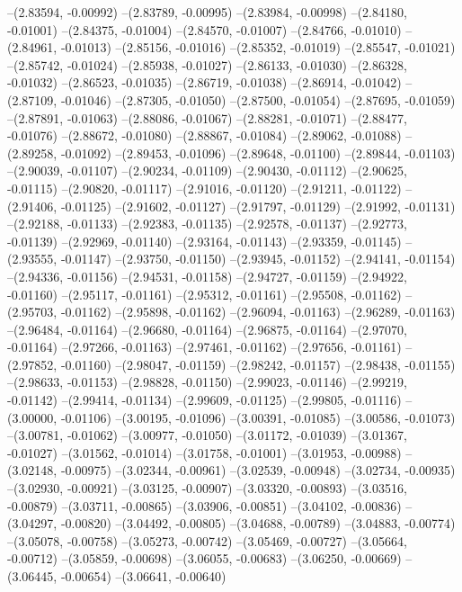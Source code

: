 --(2.83594, -0.00992)
--(2.83789, -0.00995)
--(2.83984, -0.00998)
--(2.84180, -0.01001)
--(2.84375, -0.01004)
--(2.84570, -0.01007)
--(2.84766, -0.01010)
--(2.84961, -0.01013)
--(2.85156, -0.01016)
--(2.85352, -0.01019)
--(2.85547, -0.01021)
--(2.85742, -0.01024)
--(2.85938, -0.01027)
--(2.86133, -0.01030)
--(2.86328, -0.01032)
--(2.86523, -0.01035)
--(2.86719, -0.01038)
--(2.86914, -0.01042)
--(2.87109, -0.01046)
--(2.87305, -0.01050)
--(2.87500, -0.01054)
--(2.87695, -0.01059)
--(2.87891, -0.01063)
--(2.88086, -0.01067)
--(2.88281, -0.01071)
--(2.88477, -0.01076)
--(2.88672, -0.01080)
--(2.88867, -0.01084)
--(2.89062, -0.01088)
--(2.89258, -0.01092)
--(2.89453, -0.01096)
--(2.89648, -0.01100)
--(2.89844, -0.01103)
--(2.90039, -0.01107)
--(2.90234, -0.01109)
--(2.90430, -0.01112)
--(2.90625, -0.01115)
--(2.90820, -0.01117)
--(2.91016, -0.01120)
--(2.91211, -0.01122)
--(2.91406, -0.01125)
--(2.91602, -0.01127)
--(2.91797, -0.01129)
--(2.91992, -0.01131)
--(2.92188, -0.01133)
--(2.92383, -0.01135)
--(2.92578, -0.01137)
--(2.92773, -0.01139)
--(2.92969, -0.01140)
--(2.93164, -0.01143)
--(2.93359, -0.01145)
--(2.93555, -0.01147)
--(2.93750, -0.01150)
--(2.93945, -0.01152)
--(2.94141, -0.01154)
--(2.94336, -0.01156)
--(2.94531, -0.01158)
--(2.94727, -0.01159)
--(2.94922, -0.01160)
--(2.95117, -0.01161)
--(2.95312, -0.01161)
--(2.95508, -0.01162)
--(2.95703, -0.01162)
--(2.95898, -0.01162)
--(2.96094, -0.01163)
--(2.96289, -0.01163)
--(2.96484, -0.01164)
--(2.96680, -0.01164)
--(2.96875, -0.01164)
--(2.97070, -0.01164)
--(2.97266, -0.01163)
--(2.97461, -0.01162)
--(2.97656, -0.01161)
--(2.97852, -0.01160)
--(2.98047, -0.01159)
--(2.98242, -0.01157)
--(2.98438, -0.01155)
--(2.98633, -0.01153)
--(2.98828, -0.01150)
--(2.99023, -0.01146)
--(2.99219, -0.01142)
--(2.99414, -0.01134)
--(2.99609, -0.01125)
--(2.99805, -0.01116)
--(3.00000, -0.01106)
--(3.00195, -0.01096)
--(3.00391, -0.01085)
--(3.00586, -0.01073)
--(3.00781, -0.01062)
--(3.00977, -0.01050)
--(3.01172, -0.01039)
--(3.01367, -0.01027)
--(3.01562, -0.01014)
--(3.01758, -0.01001)
--(3.01953, -0.00988)
--(3.02148, -0.00975)
--(3.02344, -0.00961)
--(3.02539, -0.00948)
--(3.02734, -0.00935)
--(3.02930, -0.00921)
--(3.03125, -0.00907)
--(3.03320, -0.00893)
--(3.03516, -0.00879)
--(3.03711, -0.00865)
--(3.03906, -0.00851)
--(3.04102, -0.00836)
--(3.04297, -0.00820)
--(3.04492, -0.00805)
--(3.04688, -0.00789)
--(3.04883, -0.00774)
--(3.05078, -0.00758)
--(3.05273, -0.00742)
--(3.05469, -0.00727)
--(3.05664, -0.00712)
--(3.05859, -0.00698)
--(3.06055, -0.00683)
--(3.06250, -0.00669)
--(3.06445, -0.00654)
--(3.06641, -0.00640)
